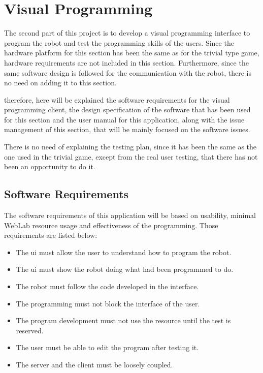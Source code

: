 \section{Visual Programming}

The second part of this project is to develop a visual programming interface to program the robot
and test the programming skills of the users. Since the hardware platform for this section has been
the same as for the trivial type game, hardware requirements are not included in this section.
Furthermore, since the same software design is followed for the communication with the robot, there
is no need on adding it to this section.

therefore, here will be explained the software requirements for the visual programming client, the
design specification of the software that has been used for this section and the user manual for
this application, along with the issue management of this section, that will be mainly focused on
the software issues.

There is no need of explaining the testing plan, since it has been the same as the one used in the
trivial game, except from the real user testing, that there has not been an opportunity to do it.

\subsection{Software Requirements}

The software requirements of this application will be based on usability, minimal WebLab resource
usage and effectiveness of the programming. Those requirements are listed below:

\begin{itemize}

	\item The \acrlong{ui} must allow the user to understand how to program the robot.
	\item The \acrlong{ui} must show the robot doing what had been programmed to do.
	\item The robot must follow the code developed in the interface.
	\item The programming must not block the interface of the user.
	\item The program development must not use the resource until the test is reserved.
	\item The user must be able to edit the program after testing it.
	\item The server and the client must be loosely coupled.

\end{itemize}

